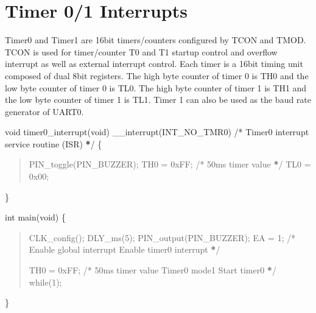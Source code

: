 \documentclass[letterpaper,10pt,english]{sphinxmanual}
\begin{document}
\section{Timer 0/1  Interrupts}
\label{\detokenize{interrupts:timer-0-1-interrupts}}
\sphinxAtStartPar
Timer0 and Timer1 are 16\sphinxhyphen{}bit timers/counters configured by TCON and TMOD. TCON is used for
timer/counter T0 and T1 startup control and overflow interrupt as well as external interrupt control. Each
timer is a 16\sphinxhyphen{}bit timing unit composed of dual 8\sphinxhyphen{}bit registers. The high byte counter of timer 0 is TH0 and
the low byte counter of timer 0 is TL0. The high byte counter of timer 1 is TH1 and the low byte counter of
timer 1 is TL1. Timer 1 can also be used as the baud rate generator of UART0.
\begin{description}
\sphinxAtStartPar
void timer0\_interrupt(void) \_\_interrupt(INT\_NO\_TMR0)        /* Timer0 interrupt service routine (ISR) {\color{red}\bfseries{}*}/
\{
\begin{quote}

\sphinxAtStartPar
PIN\_toggle(PIN\_BUZZER);
TH0 = 0xFF;             /* 50ms timer value {\color{red}\bfseries{}*}/
TL0 = 0x00;
\end{quote}

\sphinxAtStartPar
\}

\sphinxAtStartPar
int main(void)
\{
\begin{quote}

\sphinxAtStartPar
CLK\_config();
DLY\_ms(5);
PIN\_output(PIN\_BUZZER);
EA  = 1;                /* Enable global interrupt  Enable timer0 interrupt {\color{red}\bfseries{}*}/

\sphinxAtStartPar
TH0 = 0xFF;             /* 50ms timer value  Timer0 mode1  Start timer0 {\color{red}\bfseries{}*}/
while(1);
\end{quote}

\sphinxAtStartPar
\}

\end{description}
\end{document}

